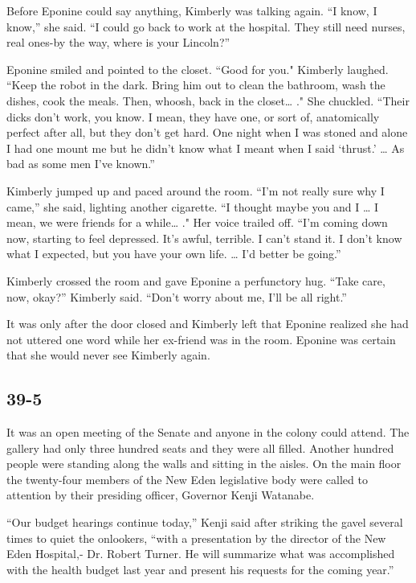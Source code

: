 \documentclass[]{article}
\begin{document}
{Before Eponine could say anything, Kimberly was talking again.  “I know, I know,” she said.  “I could go back to work at the hospital.  They still need nurses, real ones-by the way, where is your Lincoln?”

Eponine smiled and pointed to the closet.  “Good for you."  Kimberly laughed.  “Keep the robot in the dark.  Bring him out to clean the bathroom, wash the dishes, cook the meals.  Then, whoosh, back in the closet… ."  She chuckled.  “Their dicks don’t work, you know.  I mean, they have one, or sort of, anatomically perfect after all, but they don’t get hard.  One night when I was stoned and alone I had one mount me but he didn’t know what I meant when I said ‘thrust.’ … As bad as some men I’ve known.”

Kimberly jumped up and paced around the room.  “I’m not really sure why I came,” she said, lighting another cigarette.  “I thought maybe you and I … I mean, we were friends for a while… ."  Her voice trailed off.  “I’m coming down now, starting to feel depressed.  It’s awful, terrible.  I can’t stand it.  I don’t know what I expected, but you have your own life.  … I’d better be going.”

Kimberly crossed the room and gave Eponine a perfunctory hug.  “Take care, now, okay?” Kimberly said.  “Don’t worry about me, I’ll be all right.”

It was only after the door closed and Kimberly left that Eponine realized she had not uttered one word while her ex-friend was in the room.  Eponine was certain that she would never see Kimberly again.


\subsection*{39-5}

It was an open meeting of the Senate and anyone in the colony could attend.  The gallery had only three hundred seats and they were all filled.  Another hundred people were standing along the walls and sitting in the aisles.  On the main floor the twenty-four members of the New Eden legislative body were called to attention by their presiding officer, Governor Kenji Watanabe.

“Our budget hearings continue today,” Kenji said after striking the gavel several times to quiet the onlookers, “with a presentation by the director of the New Eden Hospital,- Dr.  Robert Turner.  He will summarize what was accomplished with the health budget last year and present his requests for the coming year.”

}
\end{document}
